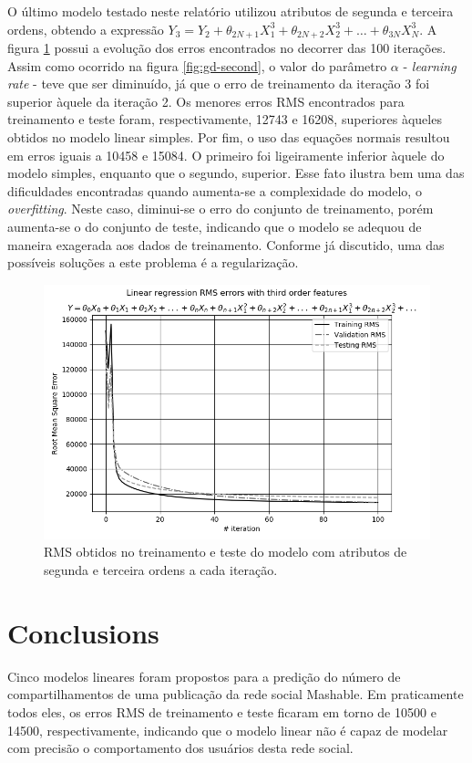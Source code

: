 \documentclass[10pt,twocolumn,letterpaper]{article}
\begin{document}
O último modelo testado neste relatório utilizou atributos de segunda e terceira ordens, obtendo a expressão \(Y_3 = Y_2 + \theta_{2N+1}X_1^3 + \theta_{2N+2}X_2^3 + \ldots + \theta_{3N}X_N^3\). A figura \ref{fig:gd-third} possui a evolução dos erros encontrados no decorrer das 100 iterações. Assim como ocorrido na figura \ref{fig:gd-second}, o valor do parâmetro \(\alpha\) - \textit{learning rate} - teve que ser diminuído, já que o erro de treinamento da iteração 3 foi superior àquele da iteração 2. Os menores erros RMS encontrados para treinamento e teste foram, respectivamente, 12743 e 16208, superiores àqueles obtidos no modelo linear simples. Por fim, o uso das equações normais resultou em erros iguais a 10458 e 15084. O primeiro foi ligeiramente inferior àquele do modelo simples, enquanto que o segundo, superior. Esse fato ilustra bem uma das dificuldades encontradas quando aumenta-se a complexidade do modelo, o \textit{overfitting}. Neste caso, diminui-se o erro do conjunto de treinamento, porém aumenta-se o do conjunto de teste, indicando que o modelo se adequou de maneira exagerada aos dados de treinamento. Conforme já discutido, uma das possíveis soluções a este problema é a regularização.

\begin{figure}
    \centering
    \includegraphics[width=0.9\columnwidth]{img/lr-third-gd.png}
    \caption{RMS obtidos no treinamento e teste do modelo com atributos de segunda e terceira ordens a cada iteração.}
    \label{fig:gd-third}
\end{figure}

\section{Conclusions}

Cinco modelos lineares foram propostos para a predição do número de compartilhamentos de uma publicação da rede social Mashable. Em praticamente todos eles, os erros RMS de treinamento e teste ficaram em torno de 10500 e 14500, respectivamente, indicando que o modelo linear não é capaz de modelar com precisão o comportamento dos usuários desta rede social.

{\small


}
\end{document}
